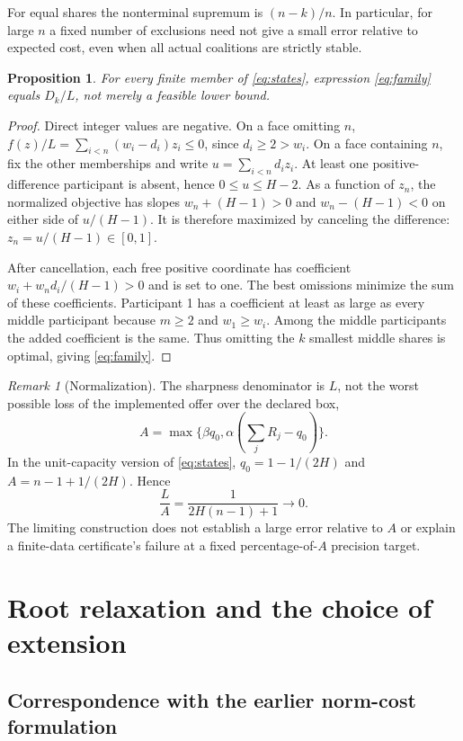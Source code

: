 \documentclass[11pt,a4paper]{article}
\newtheorem{proposition}[theorem]{Proposition}
\theoremstyle{remark}
\newtheorem{remark}[theorem]{Remark}
\begin{document}
For equal shares the nonterminal supremum is $(n-k)/n$.
In particular, for large $n$ a fixed number of exclusions need not give
a small error relative to expected cost, even when all actual coalitions
are strictly stable.

\begin{proposition}\label{prop:finite}
For every finite member of \eqref{eq:states}, expression
\eqref{eq:family} equals $D_k/L$, not merely a feasible lower bound.
\end{proposition}
\begin{proof}
Direct integer values are negative. On a face omitting $n$,
$f(z)/L=\sum_{i<n}(w_i-d_i)z_i\le0$, since $d_i\ge2>w_i$.
On a face containing $n$, fix the other memberships and write
$u=\sum_{i<n}d_iz_i$. At least one positive-difference participant
is absent, hence $0\le u\le H-2$. As a function of $z_n$, the
normalized objective has slopes $w_n+(H-1)>0$ and
$w_n-(H-1)<0$ on either side of $u/(H-1)$.
It is therefore maximized by canceling the difference:
$z_n=u/(H-1)\in[0,1]$.

After cancellation, each free positive coordinate has coefficient
$w_i+w_nd_i/(H-1)>0$ and is set to one. The best omissions minimize
the sum of these coefficients. Participant 1 has a coefficient at
least as large as every middle participant because $m\ge2$ and
$w_1\ge w_i$. Among the middle participants the added coefficient
is the same. Thus omitting the $k$ smallest middle shares is optimal,
giving \eqref{eq:family}.
\end{proof}

\begin{remark}[Normalization]\label{rem:scale}
The sharpness denominator is $L$, not the worst possible loss of the
implemented offer over the declared box,
\[
 A=\max\{\beta q_0,\alpha(\textstyle\sum_jR_j-q_0)\}.
\]
In the unit-capacity version of \eqref{eq:states},
$q_0=1-1/(2H)$ and $A=n-1+1/(2H)$. Hence
\[
 \frac{L}{A}=\frac{1}{2H(n-1)+1}\longrightarrow0.
\]
The limiting construction does not establish a large error relative to
$A$ or explain a finite-data certificate's failure at a fixed
percentage-of-$A$ precision target.
\end{remark}

\section{Root relaxation and the choice of extension}\label{sec:root}

\subsection{Correspondence with the earlier norm-cost formulation}
\end{document}
